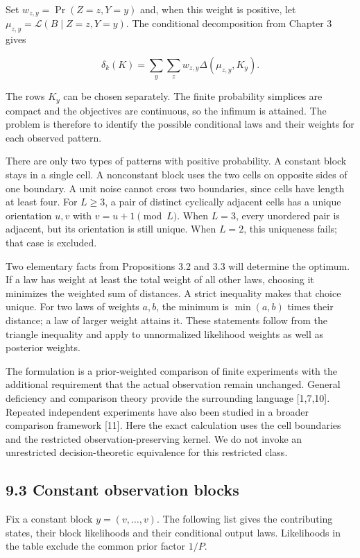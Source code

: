 \documentclass[
]{article}
\begin{document}
Set \(w_{z,y}=\Pr(Z=z,Y=y)\) and, when this weight is positive, let
\(\mu_{z,y}=\mathcal L(B\mid Z=z,Y=y)\). The conditional decomposition
from Chapter 3 gives

\[
\delta_k(K)=\sum_y\sum_z w_{z,y}\Delta(\mu_{z,y},K_y).
\]

The rows \(K_y\) can be chosen separately. The finite probability
simplices are compact and the objectives are continuous, so the infimum
is attained. The problem is therefore to identify the possible
conditional laws and their weights for each observed pattern.

There are only two types of patterns with positive probability. A
constant block stays in a single cell. A nonconstant block uses the two
cells on opposite sides of one boundary. A unit noise cannot cross two
boundaries, since cells have length at least four. For \(L\ge3\), a pair
of distinct cyclically adjacent cells has a unique orientation \(u,v\)
with \(v=u+1\pmod L\). When \(L=3\), every unordered pair is adjacent,
but its orientation is still unique. When \(L=2\), this uniqueness
fails; that case is excluded.

Two elementary facts from Propositions 3.2 and 3.3 will determine the
optimum. If a law has weight at least the total weight of all other
laws, choosing it minimizes the weighted sum of distances. A strict
inequality makes that choice unique. For two laws of weights \(a,b\),
the minimum is \(\min(a,b)\) times their distance; a law of larger
weight attains it. These statements follow from the triangle inequality
and apply to unnormalized likelihood weights as well as posterior
weights.

The formulation is a prior-weighted comparison of finite experiments
with the additional requirement that the actual observation remain
unchanged. General deficiency and comparison theory provide the
surrounding language {[}1,7,10{]}. Repeated independent experiments have
also been studied in a broader comparison framework {[}11{]}. Here the
exact calculation uses the cell boundaries and the restricted
observation-preserving kernel. We do not invoke an unrestricted
decision-theoretic equivalence for this restricted class.

\subsection{9.3 Constant observation
blocks}\label{constant-observation-blocks}

Fix a constant block \(y=(v,\ldots,v)\). The following list gives the
contributing states, their block likelihoods and their conditional
output laws. Likelihoods in the table exclude the common prior factor
\(1/P\).
\end{document}
